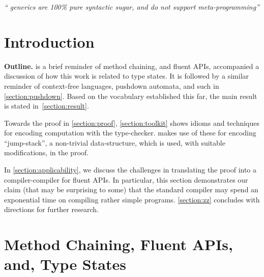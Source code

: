 \documentclass[a4paper,USenglish]{lipics-v2016}
\author[1]{Yossi Gil}
\author[1]{Tomer Levy}
\affil[1]{%
 Department of Computer Science, The
 Technion---Israel Institute of Technology, Haifa, Israel.
}
\begin{document}
\maketitle
\hfill
\parbox{40ex}{%
  \begin{flushright}
    \scriptsize\itshape `` generics are 100\% pure syntactic sugar,
    and do not support meta-programming''\footnotemark
  \end{flushright}
}
\newline


\begin{abstract}
  
\end{abstract}

\section{Introduction}


\textbf{Outline.} \small
{} is a brief reminder of method chaining,
  and fluent APIs, accompanied a discussion of how this work is related to type states.
It is followed by a similar reminder of context-free languages, pushdown automata,
  and such in \cref{section:pushdown}.
Based on the vocabulary established this far,
  the main result is stated in~\cref{section:result}.

Towards the proof in \cref{section:proof}, \cref{section:toolkit}
  shows idioms and techniques for encoding computation with  
  the \Java type-checker.
 makes use of these for encoding
  ``jump-stack'', a non-trivial data-structure,
  which is used, with suitable modifications, in the proof.

In \cref{section:applicability}, we discuss the challenges in
  translating the proof into a compiler-compiler for fluent APIs.
In particular, this section demonstrates our claim (that may be
  surprising to some) that the standard \Java compiler may spend
  an exponential time on compiling rather simple programs.
\cref{section:zz} concludes with directions for further research.
\normalsize

\section{Method Chaining, Fluent APIs, and, Type States}
\label{section:fluent}

\end{document}
